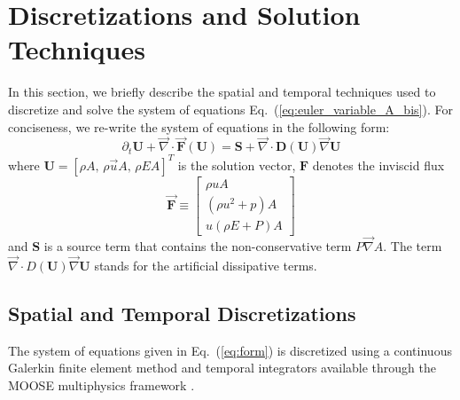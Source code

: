 \documentclass[preprint,10pt]{elsarticle}
\renewcommand{\div}{\vec{\nabla}\! \cdot \!}
\newcommand{\grad}{\vec{\nabla}}
\newcommand{\eqt}[1]{Eq.~(\ref{#1})}                     %
\begin{document}
\section{Discretizations and Solution Techniques} \label{sec:solution_tech}

In this section, we briefly describe the spatial and temporal techniques used to discretize and solve the system of equations \eqt{eq:euler_variable_A_bis}. For conciseness, we re-write the system of equations in the following form:
\begin{equation}
\label{eq:form}
\partial_t \mathbf{U} + \div \vec{\mathbf{F}}\left( \mathbf{U} \right) = \mathbf{S} + \div \mathbf{D}(\mathbf{U}) \grad \mathbf{U}
\end{equation}
where $\mathbf{U}=[\rho A,\, \rho \vec{u} A,\, \rho E A]^T$ is the solution vector, $\mathbf{F}$ denotes the inviscid flux 
\begin{equation}
  \vec{\mathbf{F}} \equiv
  \begin{bmatrix}
    \rho u A                     \\
    \left(\rho u^2 + p\right) A  \\
    u (\rho E +P) A
  \end{bmatrix}
\end{equation}
and $\mathbf{S}$ is a source term that contains the non-conservative term $P\grad A$. The term $\div D(\mathbf{U}) \grad \mathbf{U}$ stands for the artificial dissipative terms. 

\subsection{Spatial and Temporal Discretizations} \label{sec:disc}
The system of equations given in \eqt{eq:form} is discretized using a continuous Galerkin finite element method and temporal integrators available through the MOOSE multiphysics framework \cite{MOOSE}.
\end{document}
